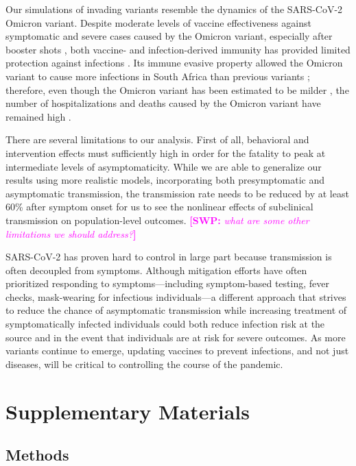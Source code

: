 \documentclass[12pt]{article}
\newcommand{\comment}{\showcomment}
\newcommand{\showcomment}[3]{\textcolor{#1}{\textbf{[#2: }\textsl{#3}\textbf{]}}}
\newcommand{\swp}[1]{\comment{magenta}{SWP}{#1}}
\begin{document}
Our simulations of invading variants resemble the dynamics of the SARS-CoV-2 Omicron variant.
Despite moderate levels of vaccine effectiveness against symptomatic and severe cases caused by the Omicron variant, especially after booster shots \citep{andres2022omicron}, both vaccine- and infection-derived immunity has provided limited protection against infections \citep{pearson2021omicron}.
Its immune evasive property allowed the Omicron variant to cause more infections in South Africa than previous variants \citep{sun2022omicron};
therefore, even though the Omicron variant has been estimated to be milder \citep{MENNI20221618,ulloa2022estimates}, the number of hospitalizations and deaths caused by the Omicron variant have remained high \citep{Iacobuccio254,faust2022omicron,sigal2022estimating}.

There are several limitations to our analysis.
First of all, behavioral and intervention effects must sufficiently high in order for the fatality to peak at intermediate levels of asymptomaticity.
While we are able to generalize our results using more realistic models, incorporating both presymptomatic and asymptomatic transmission, the transmission rate needs to be reduced by at least 60\% after symptom onset for us to see the nonlinear effects of subclinical transmission on population-level outcomes.
\swp{what are some other limitations we should address?}

SARS-CoV-2 has proven hard to control in large part because transmission is often decoupled from symptoms. 
Although mitigation efforts have often prioritized responding to symptoms---including symptom-based testing, fever checks, mask-wearing for infectious individuals---a different approach that strives to reduce the chance of asymptomatic transmission while increasing treatment of symptomatically infected individuals could both reduce infection risk at the source and in the event that individuals are at risk for severe outcomes.
As more variants continue to emerge, updating vaccines to prevent infections, and not just diseases, will be critical to controlling the course of the pandemic.

\pagebreak

\section*{Supplementary Materials}
\setcounter{figure}{0}
\renewcommand{\thefigure}{S\arabic{figure}}

\subsection*{Methods}
\end{document}

